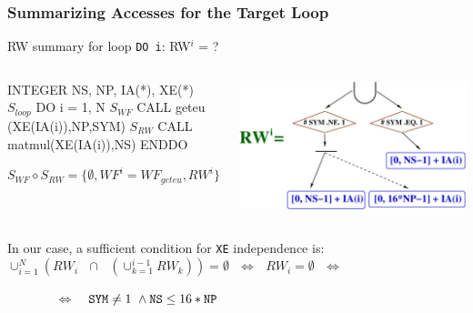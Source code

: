 \documentclass{beamer}
\renewcommand{\emph}[1]{\textcolor{structure}{#1}}
\newcommand{\emp}[1]{\textcolor{DikuRed}{ #1}}
\newcommand{\mymath}[1]{$ #1 $}
\newcommand{\myindx}[1]{_{#1}}
\newcommand{\myindu}[1]{^{#1}}
\begin{document}
\begin{frame}[fragile,t]
  \frametitle{Summarizing Accesses for the Target Loop}

\begin{block}{RW summary for loop {\tt DO i}: RW$^i$ = ? } \vspace{-1ex}
\begin{columns} 
\begin{colorcode}[fontsize=\scriptsize]
        INTEGER NS, NP, IA(*), XE(*)
\mymath{S\myindx{loop}}    \emph{DO i = 1, N}
\mymath{S\myindx{WF}}      CALL geteu (XE(IA(i)),NP,SYM)
\mymath{S\myindx{RW}}      CALL matmul(XE(IA(i)),NS)
        \emph{ENDDO}

\emp{\mymath{S\myindx{WF} \diamond S\myindx{RW} = \{\emptyset, WF\myindu{i}=WF\myindx{geteu}, RW\myindu{i}\}}}
\end{colorcode}
\begin{center}
\includegraphics[height=15ex]{Figures/L5-LoopPar/RW_IND_XE}
\end{center}
\end{columns}
\end{block}

\bigskip

In our case, a sufficient condition for {\tt XE} independence is: \bigskip \\ 
$\cup_{i=1}^{N}(RW_i \mbox{ }\cap\mbox{ } (\cup_{k=1}^{i-1}RW_k)) = \emptyset~~~\Leftrightarrow~~~RW_i = \emptyset~~~\Leftrightarrow$

\bigskip

$~~~~~~~~~~~~~~~~~\Leftrightarrow~~~$  
\emph{${\tt SYM}\neq 1\mbox{ }\wedge {\tt NS}\leq 16*{\tt NP}$} 
\end{frame}
\end{document}
